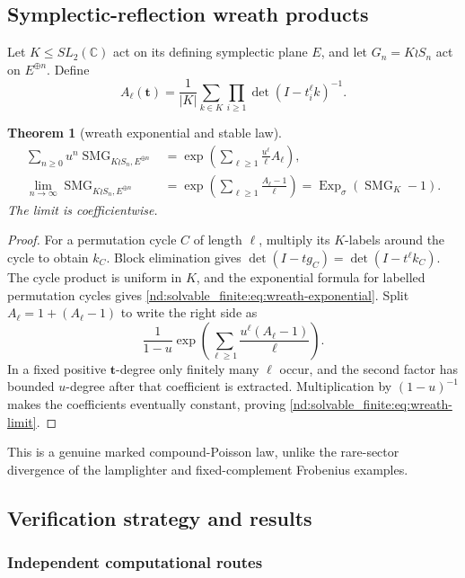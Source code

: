 \documentclass[10pt]{article}
\newcommand{\ExpS}{\operatorname{Exp}_{\sigma}}
\newcommand{\SMG}{\operatorname{SMG}}
\newcommand{\MGF}{\SMG}
\newcommand{\C}{\mathbb C}
\newtheorem{theorem}{Theorem}
\begin{document}
\subsection{Symplectic-reflection wreath products}

Let $K\leq SL_2(\C)$ act on its defining symplectic plane $E$, and let
$G_n=K\wr S_n$ act on $E^{\oplus n}$.  Define
\[
 A_\ell(\mathbf t)=\frac1{|K|}\sum_{k\in K}
 \prod_{i\geq1}\det(I-t_i^\ell k)^{-1}.
\]

\begin{theorem}[wreath exponential and stable law]\label{nd:solvable_finite:thm:wreath}
\begin{align}
 \sum_{n\geq0}u^n\MGF_{K\wr S_n,E^{\oplus n}}
 &=\boxed{\exp\!\left(\sum_{\ell\geq1}\frac{u^\ell}{\ell}A_\ell\right)},
 \label{nd:solvable_finite:eq:wreath-exponential}\\
 \lim_{n\to\infty}\MGF_{K\wr S_n,E^{\oplus n}}
 &=\boxed{\exp\!\left(\sum_{\ell\geq1}\frac{A_\ell-1}{\ell}\right)
 =\ExpS(\MGF_K-1)}.
 \label{nd:solvable_finite:eq:wreath-limit}
\end{align}
The limit is coefficientwise.
\end{theorem}

\begin{proof}
For a permutation cycle $C$ of length $\ell$, multiply its $K$-labels around
the cycle to obtain $k_C$.  Block elimination gives
$\det(I-tg_C)=\det(I-t^\ell k_C)$.  The cycle product is uniform in $K$, and
the exponential formula for labelled permutation cycles gives
\eqref{nd:solvable_finite:eq:wreath-exponential}.  Split $A_\ell=1+(A_\ell-1)$ to write the
right side as
\[
 \frac1{1-u}\exp\!\left(\sum_{\ell\geq1}
 \frac{u^\ell(A_\ell-1)}\ell\right).
\]
In a fixed positive $\mathbf t$-degree only finitely many $\ell$ occur, and
the second factor has bounded $u$-degree after that coefficient is extracted.
Multiplication by $(1-u)^{-1}$ makes the coefficients eventually constant,
proving \eqref{nd:solvable_finite:eq:wreath-limit}.
\end{proof}

This is a genuine marked compound-Poisson law, unlike the rare-sector
divergence of the lamplighter and fixed-complement Frobenius examples.

\subsection{Verification strategy and results}

\subsubsection{Independent computational routes}
\end{document}
